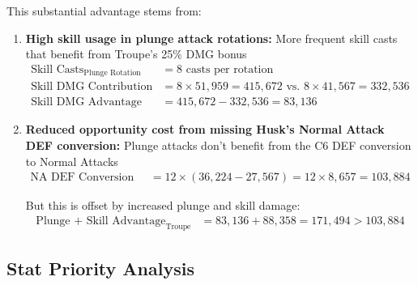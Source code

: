 \documentclass[12pt,a4paper]{article}
\begin{document}
This substantial advantage stems from:

\begin{enumerate}
    \item \textbf{High skill usage in plunge attack rotations:} More frequent skill casts that benefit from Troupe's 25\% DMG bonus
    \begin{align}
    \text{Skill Casts}_{\text{Plunge Rotation}} &= 8 \text{ casts per rotation} \\
    \text{Skill DMG Contribution} &= 8 \times 51,959 = 415,672 \text{ vs. } 8 \times 41,567 = 332,536 \\
    \text{Skill DMG Advantage} &= 415,672 - 332,536 = 83,136
    \end{align}
    
    \item \textbf{Reduced opportunity cost from missing Husk's Normal Attack DEF conversion:} Plunge attacks don't benefit from the C6 DEF conversion to Normal Attacks
    \begin{align}
    \text{NA DEF Conversion Loss} &= 12 \times (36,224 - 27,567) = 12 \times 8,657 = 103,884
    \end{align}
    
    But this is offset by increased plunge and skill damage:
    \begin{align}
    \text{Plunge + Skill Advantage}_{\text{Troupe}} &= 83,136 + 88,358 = 171,494 > 103,884
    \end{align}
\end{enumerate}

\subsection{Stat Priority Analysis}
\end{document}
